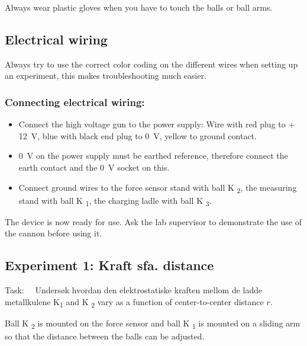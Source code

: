 \documentclass[../Elmag-labhefte-2020.tex]{subfiles}
\begin{document}
\begin{itemize}
Always wear plastic gloves when you have to touch the balls or ball arms.


\subsection{Electrical wiring}
Always try to use the correct color coding on the different wires when setting up an experiment, this makes troubleshooting much easier.

\subsubsection{Connecting electrical wiring:}

\vspace{-4mm}
\begin{itemize}
    \item Connect the high voltage gun to the power supply: Wire with red plug to + \SI{12}{\volt}, blue with black end plug to \SI{0}{\volt}, yellow to ground contact.
    \item \SI{0}{\volt} on the power supply must be earthed reference, therefore connect the earth contact and the \SI{0}{\volt} socket on this.
    \item Connect ground wires to the force sensor stand with ball K \textsubscript{2}, the measuring stand with ball K \textsubscript{1}, the charging ladle with ball K \textsubscript{3}.
\end{itemize}

The device is now ready for use. Ask the lab supervisor to demonstrate the use of the cannon before using it.



\subsection{Experiment 1: Kraft sfa. distance}
 
Task: \ \
{\itsf Undersøk hvordan den elektrostatiske kraften mellom de ladde metallkulene K\textsubscript{1} and K \textsubscript{2} vary as a function of center-to-center distance $r$.
}

Ball K \textsubscript{2} is mounted on the force sensor and ball K \textsubscript{1} is mounted on a sliding arm so that the distance between the balls can be adjusted.



\end{itemize}
\end{document}
